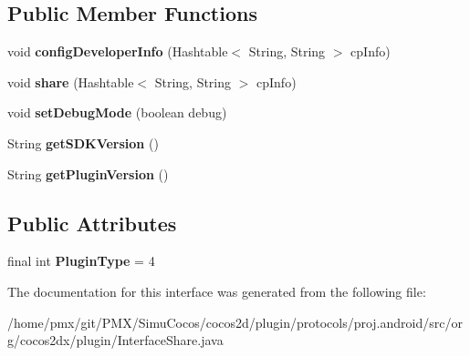 \subsection*{Public Member Functions}
\begin{DoxyCompactItemize}
\item 
\mbox{\label{interfaceorg_1_1cocos2dx_1_1plugin_1_1InterfaceShare_afdfe1d1e9fc11f96e66d86523e463f57}} 
void {\bfseries config\+Developer\+Info} (Hashtable$<$ String, String $>$ cp\+Info)
\item 
\mbox{\label{interfaceorg_1_1cocos2dx_1_1plugin_1_1InterfaceShare_a7950d2e88ae58f55788b11b69fcd9ead}} 
void {\bfseries share} (Hashtable$<$ String, String $>$ cp\+Info)
\item 
\mbox{\label{interfaceorg_1_1cocos2dx_1_1plugin_1_1InterfaceShare_a63b886ddd43f8efd2870344d03bc13ca}} 
void {\bfseries set\+Debug\+Mode} (boolean debug)
\item 
\mbox{\label{interfaceorg_1_1cocos2dx_1_1plugin_1_1InterfaceShare_a5f77e29d8b4eb3ad389a793cc9f90790}} 
String {\bfseries get\+S\+D\+K\+Version} ()
\item 
\mbox{\label{interfaceorg_1_1cocos2dx_1_1plugin_1_1InterfaceShare_a17dbd24dc149f9edc471388c15d60598}} 
String {\bfseries get\+Plugin\+Version} ()
\end{DoxyCompactItemize}
\subsection*{Public Attributes}
\begin{DoxyCompactItemize}
\item 
\mbox{\label{interfaceorg_1_1cocos2dx_1_1plugin_1_1InterfaceShare_a7c594c1a008d3bfe9ed4ff22e9878ef0}} 
final int {\bfseries Plugin\+Type} = 4
\end{DoxyCompactItemize}


The documentation for this interface was generated from the following file\+:\begin{DoxyCompactItemize}
\item 
/home/pmx/git/\+P\+M\+X/\+Simu\+Cocos/cocos2d/plugin/protocols/proj.\+android/src/org/cocos2dx/plugin/Interface\+Share.\+java\end{DoxyCompactItemize}
